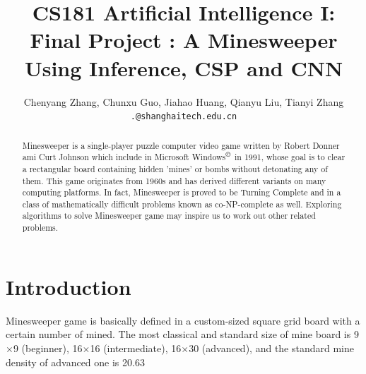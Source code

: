 \documentclass[10pt,twocolumn,letterpaper]{article}
\begin{document}
\title{CS181 Artificial Intelligence I: \\ Final Project : A Minesweeper Using Inference, CSP and CNN}

\author{Chenyang Zhang, Chunxu Guo, Jiahao Huang, Qianyu Liu, Tianyi Zhang\\

{\tt\small .@shanghaitech.edu.cn}
}

\maketitle

\begin{abstract}
Minesweeper is a single-player puzzle computer video game written by Robert Donner ami Curt Johnson which include in Microsoft Windows$^{\copyright}$ in 1991, whose goal is to clear a rectangular board containing hidden 'mines' or bombs without detonating any of them. This game originates from 1960s and has derived different variants on many computing platforms. In fact, Minesweeper is proved to be Turning Complete and in a class of mathematically difficult problems known as co-NP-complete as well. Exploring algorithms to solve Minesweeper game may inspire us to work out other related problems.
\end{abstract}


\section{Introduction}
Minesweeper game is basically defined in a custom-sized square grid board with a certain number of mined. The most classical and standard size of mine board is 9$\times$9 (beginner),  16$\times$16 (intermediate), 16$\times$30 (advanced), and the standard mine density of advanced one is 20.63%
\end{document}
